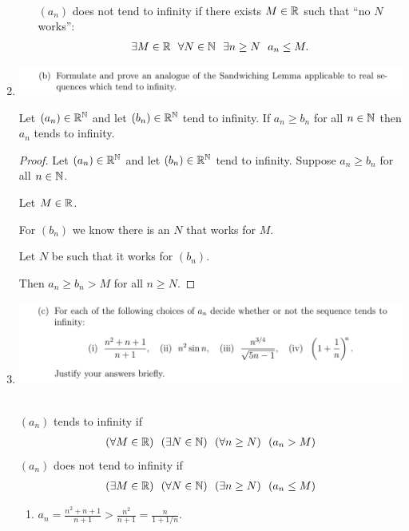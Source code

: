 \documentclass[12pt]{article}
\begin{document}
\begin{enumerate}[label=(\alph*)]
\begin{definition*}
\begin{enumerate}[label=(\roman*)]
\begin{align*}
      \end{align*}
      $(a_n)$ does not tend to infinity if there exists $M \in \mathbb{R}$ such that ``no $N$ works'':
      \begin{align*}
        \exists M \in \mathbb{R} ~~ \forall N \in \mathbb{N} ~~ \exists n \geq N ~~ a_n \leq M.
      \end{align*}
    \end{enumerate}
  \end{definition*}
\item\hspace{0pt}
  \begin{mdframed}
    \includegraphics[width=400pt]{img/oxford-M2-analysis-I-3-4-b.png}
  \end{mdframed}
  \begin{claim*}
    Let $(a_n) \in \mathbb{R}^{\mathbb{N}}$ and let $(b_n) \in \mathbb{R}^{\mathbb{N}}$ tend to infinity. If $a_n \geq b_n$ for all
    $n \in \mathbb{N}$ then $a_n$ tends to infinity.
  \end{claim*}
  \begin{proof}
    Let $(a_n) \in \mathbb{R}^{\mathbb{N}}$ and let $(b_n) \in \mathbb{R}^{\mathbb{N}}$ tend to infinity. Suppose $a_n \geq b_n$ for
    all $n \in \mathbb{N}$.

    Let $M \in \mathbb{R}$.

    For $(b_n)$ we know there is an $N$ that works for $M$.

    Let $N$ be such that it works for $(b_n)$.

    Then $a_n \geq b_n > M$ for all $n \geq N$.
  \end{proof}
\newpage
\item\hspace{0pt}
  \begin{mdframed}
    \includegraphics[width=400pt]{img/oxford-M2-analysis-I-3-4-c.png}
  \end{mdframed}
  \begin{definition*}~\\
    $(a_n)$ tends to infinity if
    \begin{align*}
      (\forall M \in \mathbb{R}) ~~ (\exists N \in \mathbb{N}) ~~ (\forall n \geq N) ~~ (a_n > M)
    \end{align*}
    $(a_n)$ does not tend to infinity if
    \begin{align*}
      (\exists M \in \mathbb{R}) ~~ (\forall N \in \mathbb{N}) ~~ (\exists n \geq N) ~~ (a_n \leq M)
    \end{align*}
  \end{definition*}
  \begin{enumerate}[label=(\roman*)]
  \item $a_n = \frac{n^2 + n + 1}{n + 1} > \frac{n^2}{n + 1} = \frac{n}{1 + 1/n}$.


\end{enumerate}
\end{enumerate}
\end{document}
